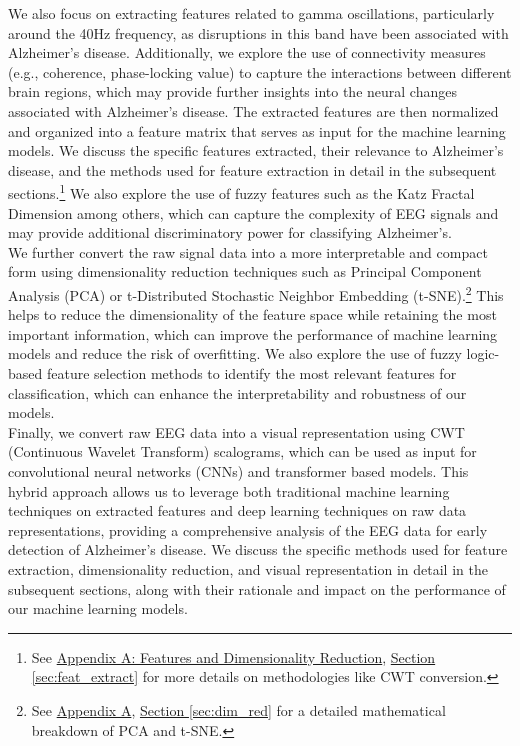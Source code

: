 \documentclass[openany]{book}
\begin{document}
We also focus on extracting features related to gamma oscillations, particularly around the 40Hz frequency, as disruptions in this band have been associated with Alzheimer's disease. Additionally, we explore the use of connectivity measures (e.g., coherence, phase-locking value) to capture the interactions between different brain regions, which may provide further insights into the neural changes associated with Alzheimer's disease. The extracted features are then normalized and organized into a feature matrix that serves as input for the machine learning models. We discuss the specific features extracted, their relevance to Alzheimer's disease, and the methods used for feature extraction in detail in the subsequent sections.\footnote{See \hyperref[app:A]{Appendix A: Features and Dimensionality Reduction}, \hyperref[sec:feat_extract]{Section \ref*{sec:feat_extract}} for more details on methodologies like CWT conversion.} We also explore the use of fuzzy features such as the Katz Fractal Dimension among others, which can capture the complexity of EEG signals and may provide additional discriminatory power for classifying Alzheimer's. \\
We further convert the raw signal data into a more interpretable and compact form using dimensionality reduction techniques such as Principal Component Analysis (PCA) or t-Distributed Stochastic Neighbor Embedding (t-SNE).\footnote{See \hyperref[app:A]{Appendix A}, \hyperref[sec:dim_red]{Section \ref*{sec:dim_red}} for a detailed mathematical breakdown of PCA and t-SNE.} This helps to reduce the dimensionality of the feature space while retaining the most important information, which can improve the performance of machine learning models and reduce the risk of overfitting. We also explore the use of fuzzy logic-based feature selection methods to identify the most relevant features for classification, which can enhance the interpretability and robustness of our models. \\
Finally, we convert raw EEG data into a visual representation using CWT (Continuous Wavelet Transform) scalograms, which can be used as input for convolutional neural networks (CNNs) and transformer based models. This hybrid approach allows us to leverage both traditional machine learning techniques on extracted features and deep learning techniques on raw data representations, providing a comprehensive analysis of the EEG data for early detection of Alzheimer's disease. We discuss the specific methods used for feature extraction, dimensionality reduction, and visual representation in detail in the subsequent sections, along with their rationale and impact on the performance of our machine learning models. \\
\end{document}

